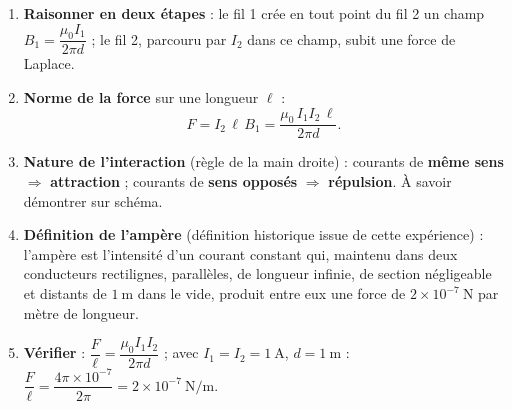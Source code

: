 \documentclass[11pt]{article}
\begin{document}
\begin{methode}
\begin{enumerate}
\item \textbf{Raisonner en deux étapes} : le fil 1 crée en tout point du fil 2 un champ $B_1 = \dfrac{\mu_0 I_1}{2\pi d}$ ; le fil 2, parcouru par $I_2$ dans ce champ, subit une force de Laplace.
\item \textbf{Norme de la force} sur une longueur $\ell$ :
\[ F = I_2\,\ell\,B_1 = \dfrac{\mu_0\,I_1 I_2\,\ell}{2\pi d}. \]
\item \textbf{Nature de l'interaction} (règle de la main droite) : courants de \textbf{même sens} $\Rightarrow$ \textbf{attraction} ; courants de \textbf{sens opposés} $\Rightarrow$ \textbf{répulsion}. À savoir démontrer sur schéma.
\item \textbf{Définition de l'ampère} (définition historique issue de cette expérience) : l'ampère est l'intensité d'un courant constant qui, maintenu dans deux conducteurs rectilignes, parallèles, de longueur infinie, de section négligeable et distants de $1\ \mathrm{m}$ dans le vide, produit entre eux une force de $2\times 10^{-7}\ \mathrm{N}$ par mètre de longueur.
\item \textbf{Vérifier} : $\dfrac{F}{\ell} = \dfrac{\mu_0 I_1 I_2}{2\pi d}$ ; avec $I_1 = I_2 = 1\ \mathrm{A}$, $d = 1\ \mathrm{m}$ : $\dfrac{F}{\ell} = \dfrac{4\pi\times 10^{-7}}{2\pi} = 2\times 10^{-7}\ \mathrm{N/m}$.
\end{enumerate}
\end{methode}
\end{document}
